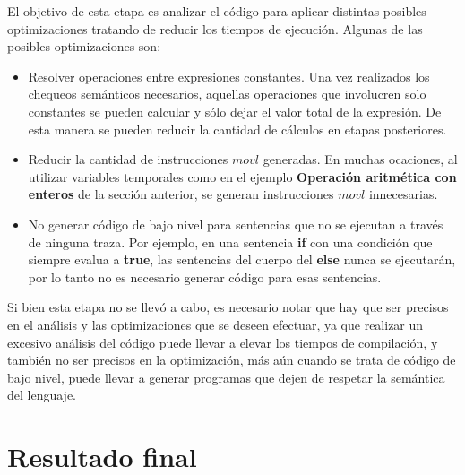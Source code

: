 \documentclass[11pt,a4paper]{article}
\begin{document}
El objetivo de esta etapa es analizar el código para aplicar distintas posibles optimizaciones tratando de reducir los tiempos de ejecución. Algunas de las posibles optimizaciones son:
\begin{itemize}
	\item Resolver operaciones entre expresiones constantes. Una vez realizados los chequeos semánticos necesarios, aquellas operaciones que involucren solo constantes se pueden calcular y sólo dejar el valor total de la expresión. De esta manera se pueden reducir la cantidad de cálculos en etapas posteriores.
	\item Reducir la cantidad de instrucciones $movl$ generadas. En muchas ocaciones, al utilizar variables temporales como en el ejemplo \textbf{Operación aritmética con enteros} de la sección anterior, se generan instrucciones $movl$ innecesarias. 
	\item No generar código de bajo nivel para sentencias que no se ejecutan a través de ninguna traza. Por ejemplo, en una sentencia \textbf{if} con una condición que siempre evalua a \textbf{true}, las sentencias del cuerpo del \textbf{else} nunca se ejecutarán, por lo tanto no es necesario generar código para esas sentencias.
\end{itemize}

Si bien esta etapa no se llevó a cabo, es necesario notar que hay que ser precisos en el análisis y las optimizaciones que se deseen efectuar, ya que realizar un excesivo análisis del código puede llevar a elevar los tiempos de compilación, y también no ser precisos en la optimización, más aún cuando se trata de código de bajo nivel, puede llevar a generar programas que dejen de respetar la semántica del lenguaje. 

\section{Resultado final} 
\label{sec:concl}
\end{document}
